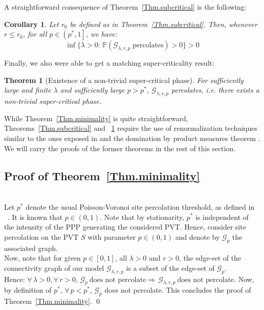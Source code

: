 \documentclass[11pt,a4paper]{amsart}
\theoremstyle{exampstyle}
\newtheorem{Theorem}{Theorem}
\newtheorem{Corollary}{Corollary}
\theoremstyle{exampnotations}
\begin{document}
A straightforward consequence of Theorem~\ref{Thm.subcritical} is the following:

\begin{Corollary}
\label{Coroll.subcritical}
Let $r_0$ be defined as in Theorem~\ref{Thm.subcritical}. Then, whenever $r \leq r_{0}$, for all $p \in \left(p^*,1\right]$, we have:
\begin{equation*}
    \inf \lbrace \lambda > 0 : \, \mathbb{P}(\mathcal{G}_{\lambda, r, p} \; \text{percolates}) > 0 \rbrace > 0
\end{equation*}
\end{Corollary}

Finally, we also were able to get a matching super-criticality result:

\begin{Theorem}[Existence of a non-trivial super-critical phase]
\label{Thm.supercritical}
For sufficiently large and finite $\lambda$ and sufficiently large $p > p^*$, $\mathcal{G}_{\lambda,r,p}$ percolates, i.e. there exists a non-trivial super-critical phase.
\end{Theorem}

While Theorem~\ref{Thm.minimality} is quite straightforward, Theorems~\ref{Thm.subcritical} and ~\ref{Thm.supercritical} require the use of renormalization techniques similar to the ones exposed in \cite{hirsch_continuum_2017} and the domination by product measures theorem \cite[Theorem 0.0]{liggett_domination_1997}. \\
We will carry the proofs of the former theorems in the rest of this section.

\subsection{Proof of Theorem~\ref{Thm.minimality}}\mbox{}\\
\indent Let $p^*$ denote the usual Poisson-Voronoi site percolation threshold, as defined in ~\cite{becker_percolation_2009,neher2008topological}. It is known that $p \in \left(0,1\right)$. Note that by stationarity, $p^*$ is independent of the intensity of the PPP generating the considered PVT. Hence, consider site percolation on the PVT $S$ with parameter $p \in \left(0,1\right)$ and denote by $\mathcal{G}_p$ the associated graph. \\
Now, note that for given $p \in \left[0,1\right]$, all $\lambda >0$ and $r>0$, the edge-set of the connectivity graph of our model $\mathcal{G}_{\lambda,r,p}$ is a subset of the edge-set of $\mathcal{G}_p$. 
\\Hence: $\forall \, \lambda >0, \forall \, r>0, \, \mathcal{G}_{p} \ \text{does not percolate} \Rightarrow \, \mathcal{G}_{\lambda, r, p} \ \text{does not percolate}$.
Now, by definition of $p^*$, $\forall \, p < p^*, \, \mathcal{G}_p$ does not percolate. This concludes the proof of Theorem~\ref{Thm.minimality}. \qed
\\
\end{document}
